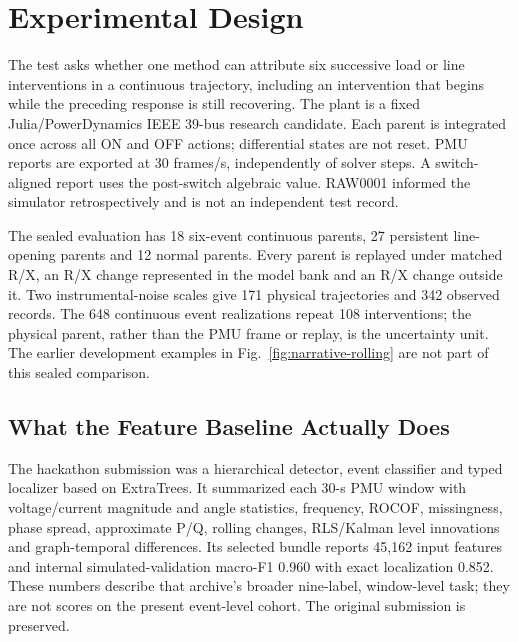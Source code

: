 \section{Experimental Design}
\label{sec:narrative-protocol}

The test asks whether one method can attribute six successive load or line
interventions in a continuous trajectory, including an intervention that
begins while the preceding response is still recovering. The plant is a
fixed Julia/PowerDynamics IEEE 39-bus research candidate. Each parent is
integrated once across all ON and OFF actions; differential states are not
reset. PMU reports are exported at 30 frames/s, independently of solver
steps. A switch-aligned report uses the post-switch algebraic value.
RAW0001 informed the simulator retrospectively and is not an independent
test record.

The sealed evaluation has 18 six-event continuous parents, 27 persistent
line-opening parents and 12 normal parents. Every parent is replayed under
matched R/X, an R/X change represented in the model bank and an R/X change
outside it. Two instrumental-noise scales give 171 physical trajectories
and 342 observed records. The 648 continuous event realizations repeat
108 interventions; the physical parent, rather than the PMU frame or
replay, is the uncertainty unit. The earlier development examples in
Fig.~\ref{fig:narrative-rolling} are not part of this sealed comparison.

\subsection{What the Feature Baseline Actually Does}
The hackathon submission was a hierarchical detector, event classifier
and typed localizer based on ExtraTrees. It summarized each 30-s PMU
window with voltage/current magnitude and angle statistics, frequency,
ROCOF, missingness, phase spread, approximate P/Q, rolling changes,
RLS/Kalman level innovations and graph-temporal differences. Its selected
bundle reports 45,162 input features and internal simulated-validation
macro-F1 0.960 with exact localization 0.852. These numbers describe that
archive's broader nine-label, window-level task; they are not scores on
the present event-level cohort. The original submission is preserved.

